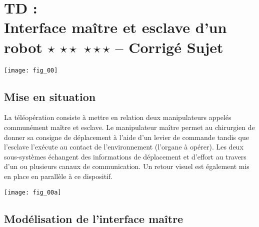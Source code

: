 \chapter*{TD  :\\ 
Interface maître et esclave d'un robot  \ifnormal $\star$ \else \fi \ifdifficile $\star\star$ \else \fi \iftdifficile $\star\star\star$ \else \fi
 -- \ifprof Corrigé \else Sujet \fi}

\iflivret {} \else
\ifprof  {} \else \fi
\fi

\setcounter{question}{0}

\begin{marginfigure}
\texttt{[image: fig\_00]}
\end{marginfigure}


\section*{Mise en situation}
\ifprof
\else
La téléopération consiste à mettre en relation deux manipulateurs appelés communément
maître et esclave. Le manipulateur maître permet au chirurgien de donner sa consigne de
déplacement à l’aide d’un levier de commande tandis que l’esclave l’exécute au contact de
l’environnement (l’organe à opérer). Les deux sous-systèmes échangent des informations de
déplacement et d’effort au travers d’un ou plusieurs canaux de communication. Un retour
visuel est également mis en place en parallèle à ce dispositif.

\begin{marginfigure}
\texttt{[image: fig\_00a]}
\end{marginfigure}
\fi

\section*{Modélisation de l’interface maître}
\ifprof
\else

